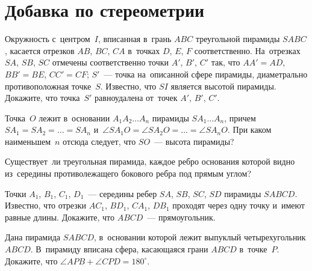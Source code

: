 
\section*{Добавка по стереометрии}



\begin{problems}


\item
Окружность с~центром~$I$, вписанная в~грань $ABC$ треугольной пирамиды $SABC$,
касается отрезков $AB$, $BC$, $CA$ в~точках $D$, $E$, $F$ соответственно.
На~отрезках $SA$, $SB$, $SC$ отмечены соответственно точки $A'$, $B'$, $C'$
так, что $AA' = AD$, $BB' = BE$, $CC' = CF$;
$S'$~— точка на~описанной сфере пирамиды, диаметрально противоположная
точке~$S$.
Известно, что $SI$ является высотой пирамиды.
Докажите, что точка~$S'$ равноудалена от~точек $A'$, $B'$, $C'$.

\item
Точка~$O$ лежит в~основании $A_1 A_2 \ldots A_n$ пирамиды $S A_1 \ldots A_n$,
причем $S A_1 = S A_2 = \ldots = S A_n$
и~$\angle S A_1 O = \angle S A_2 O = \ldots = \angle S A_n O$.
При каком наименьшем~$n$ отсюда следует, что $SO$~— высота пирамиды?

\item
Существует~ли треугольная пирамида, каждое ребро основания которой видно
из~середины противолежащего бокового ребра под прямым углом?

\item
Точки $A_1$, $B_1$, $C_1$, $D_1$~— середины ребер $SA$, $SB$, $SC$, $SD$
пирамиды $SABCD$.
Известно, что отрезки $A C_1$, $B D_1$, $C A_1$, $D B_1$ проходят через одну
точку и~имеют равные длины.
Докажите, что $ABCD$~— прямоугольник.

\item
Дана пирамида $SABCD$, в~основании которой лежит выпуклый четырехугольник
$ABCD$.
В~пирамиду вписана сфера, касающаяся грани $ABCD$ в~точке~$P$.
Докажите, что $\angle APB + \angle CPD = 180^\circ$.


\end{problems}
